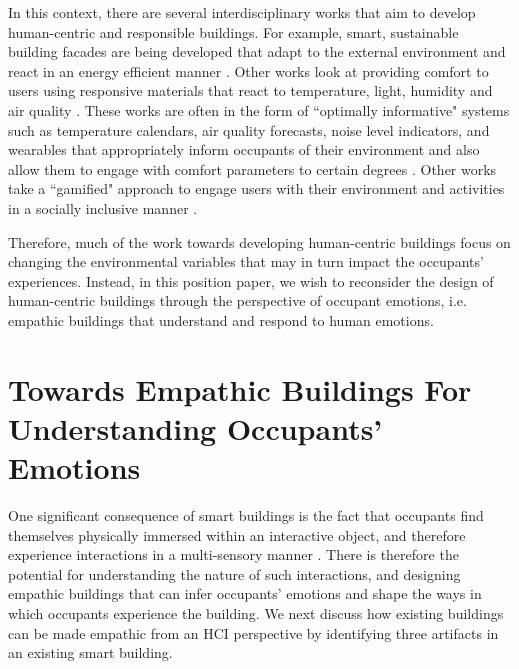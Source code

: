 \documentclass [sigconf] {acmart}
\begin{document}
In this context, there are several interdisciplinary works that aim to develop human-centric and responsible buildings. For example, smart, sustainable building facades are being developed that adapt to the external environment and react in an energy efficient manner \cite{ahmed2015development}. Other works look at providing comfort to users using responsive materials that react to temperature, light, humidity and air quality \cite{fragkia2020exergy, holstov2015hygromorphic}. These works are often in the form of ``optimally informative" systems such as temperature calendars, air quality forecasts, noise level indicators, and wearables that appropriately inform occupants of their environment and also allow them to engage with comfort parameters to certain degrees  \cite{costanza2016bit, kim2020designing}. Other works take a ``gamified" approach to engage users with their environment and activities in a socially inclusive manner \cite{mathur2015tiny, zhong2022augmenting}. 

Therefore, much of the work towards developing human-centric buildings focus on changing the environmental variables that may in turn impact the occupants' experiences. Instead, in this position paper, we wish to reconsider the design of human-centric buildings through the perspective of occupant emotions, i.e. empathic buildings that understand and respond to human emotions.


\section{Towards Empathic Buildings For Understanding Occupants' Emotions}

\label{sec:empathic-buildings}
One significant consequence of smart buildings is the fact that occupants find themselves physically immersed within an interactive object, and therefore experience interactions in a multi-sensory manner \cite{nembrini2017human}. There is therefore the potential for understanding the nature of such interactions, and designing empathic buildings that can infer occupants' emotions and shape the ways in which occupants experience the building. We next discuss how existing buildings can be made empathic from an HCI perspective by identifying three artifacts in an existing smart building.  
 
\end{document}
